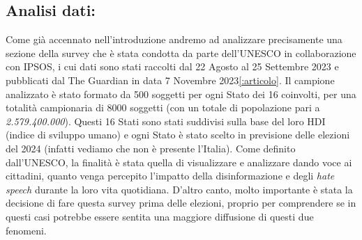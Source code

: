 \documentclass{article}
\begin{document}
\newpage\centering\subsection{Analisi dati:}

\begin{justify}    
Come già accennato nell'introduzione andremo ad analizzare precisamente una sezione della survey che è stata condotta da parte dell'UNESCO in collaborazione con IPSOS, i cui dati sono stati raccolti dal 22 Agosto al 25 Settembre 2023 e pubblicati dal The Guardian in data 7 Novembre 2023\ref{:articolo}. \citep{Unesco}
Il campione analizzato è stato formato da 500 soggetti per ogni Stato dei 16 coinvolti, per una totalità campionaria di 8000 soggetti (con un totale di popolazione pari a \textit{2.579.400.000}).
Questi 16 Stati sono stati suddivisi sulla base del loro HDI (indice di sviluppo umano) e ogni Stato è stato scelto in previsione delle elezioni del 2024 (infatti vediamo che non è presente l'Italia).
Come definito dall'UNESCO, la finalità è stata quella di visualizzare e analizzare dando voce ai cittadini, quanto venga percepito l'impatto della disinformazione e degli \textit{hate speech} durante la loro vita quotidiana. D'altro canto, molto importante è stata la decisione di fare questa survey prima delle elezioni, proprio per comprendere se in questi casi potrebbe essere sentita una maggiore diffusione di questi due fenomeni.
\end{justify}
\end{document}
